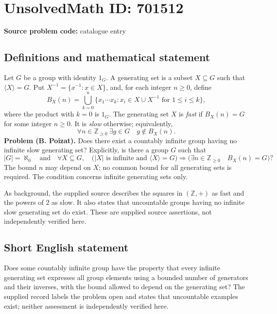 \documentclass[11pt]{article}
\newcommand{\Z}{\mathbb{Z}}
\begin{document}
\section*{UnsolvedMath ID: 701512}
\textbf{Source problem code:} catalogue entry
\subsection{Definitions and mathematical statement}
Let \(G\) be a group with identity \(1_G\). A generating set is a subset \(X\subseteq G\) such that \(\langle X\rangle=G\). Put \(X^{-1}=\{x^{-1}:x\in X\}\), and, for each integer \(n\geq 0\), define
\[
B_X(n)=\bigcup_{k=0}^{n}\{x_1\cdots x_k:x_i\in X\cup X^{-1}\text{ for }1\leq i\leq k\},
\]
where the product with \(k=0\) is \(1_G\). The generating set \(X\) is \emph{fast} if \(B_X(n)=G\) for some integer \(n\geq 0\). It is \emph{slow} otherwise; equivalently,
\[
\forall n\in\Z_{\geq 0}\ \exists g\in G\quad g\notin B_X(n).
\]
\textbf{Problem (B. Poizat).} Does there exist a countably infinite group having no infinite slow generating set? Explicitly, is there a group \(G\) such that
\[
|G|=\aleph_0
\quad\text{and}\quad
\forall X\subseteq G,\quad
\bigl(|X|\text{ is infinite and }\langle X\rangle=G\bigr)
\Longrightarrow
\bigl(\exists n\in\Z_{\geq 0}\quad B_X(n)=G\bigr)?
\]
The bound \(n\) may depend on \(X\); no common bound for all generating sets is required. The condition concerns infinite generating sets only.

As background, the supplied source describes the squares in \((\Z,+)\) as fast and the powers of \(2\) as slow. It also states that uncountable groups having no infinite slow generating set do exist. These are supplied source assertions, not independently verified here.
\subsection{Short English statement}
Does some countably infinite group have the property that every infinite generating set expresses all group elements using a bounded number of generators and their inverses, with the bound allowed to depend on the generating set? The supplied record labels the problem open and states that uncountable examples exist; neither assessment is independently verified here.
\end{document}

